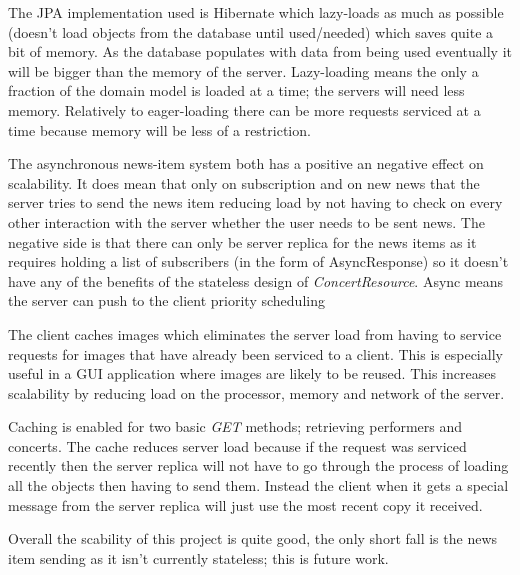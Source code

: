 \documentclass[10pt]{article}
\begin{document}
\par
The JPA implementation used is Hibernate which lazy-loads as much as possible (doesn't load objects from the database until used/needed) which saves quite a bit of memory. As the database populates with data from being used eventually it will be bigger than the memory of the server. Lazy-loading means the only a fraction of the domain model is loaded at a time; the servers will need less memory.  Relatively to eager-loading there can be more requests serviced at a time because memory will be less of a restriction.\\
\par
The asynchronous news-item system both has a positive an negative effect on scalability. It does mean that only on subscription and on new news that the server tries to send the news item reducing load by not having to check on every other interaction with the server whether the user needs to be sent news. The negative side is that there can only be server replica for the news items as it requires holding a list of subscribers (in the form of AsyncResponse) so it doesn't have any of the benefits of the stateless design of \textit{ConcertResource}.
Async means the server can push to the client
    priority scheduling \\
\par
The client caches images which eliminates the server load from having to service requests for images that have already been serviced to a client. This is especially useful in a GUI application where images are likely to be reused. This increases scalability by reducing load on the processor, memory and network of the server.\\
\par
Caching is enabled for two basic \textit{GET} methods; retrieving performers and concerts. The cache reduces server load because if the request was serviced recently then the server replica will not have to go through the process of loading all the objects then having to send them. Instead the client when it gets a special message from the server replica will just use the most recent copy it received.\\
\par
Overall the scability of this project is quite good, the only short fall is the news item sending as it isn't currently stateless; this is future work.
\end{document}
